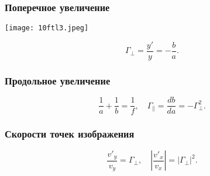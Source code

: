 \documentclass[12pt, a4paper]{article}
\begin{document}
\subsubsection*{Поперечное увеличение}

\begin{center}
\texttt{[image: 10ftl3.jpeg]}
\end{center}

\[
\Gamma_{\perp}=\frac{y'}{y}=-\frac{b}{a}.
\]

\subsubsection*{Продольное увеличение}

\[
\frac{1}{a}+\frac{1}{b}=\frac{1}{f}, \quad
\Gamma_{\parallel}=\frac{db}{da}=-\Gamma_{\perp}^{2}.
\]

\subsubsection*{Скорости точек изображения}

\[
\boxed{
\frac{v'_y}{v_y}=\Gamma_{\perp}, \quad
\left|\frac{v'_x}{v_x}\right|=|\Gamma_{\perp}|^2.
}
\]
\end{document}
